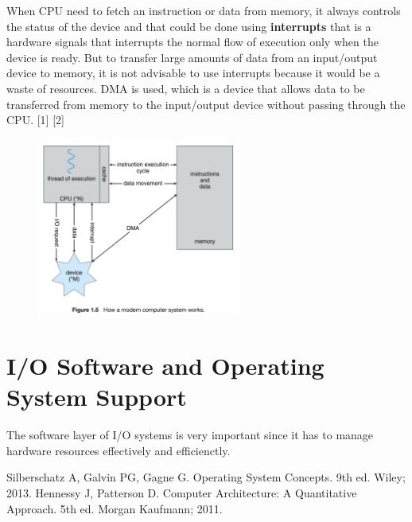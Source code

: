 \documentclass[a4paper]{article}
\begin{document}
When CPU need to fetch an instruction or data from memory, it always controls the status of the device and that could be done using \textbf{interrupts} that is a hardware signals 
that interrupts the normal flow of execution only when the device is ready. But to
 transfer large amounts of data from an input/output device to memory, it is
not advisable to use interrupts because it would be a waste of resources. DMA is used, which 
is a device that allows data to be transferred from memory to the input/output device without passing 
through the CPU. [1] [2]


\begin{figure}[H]
    \centering
    \includegraphics[width=0.6\textwidth]{DMA.png}
\end{figure}

\section{I/O Software and Operating System Support}

The software layer of I/O systems is very important since it has to manage hardware resources effectively and efficienctly.


\begin{thebibliography}{9}
    Silberschatz A, Galvin PG, Gagne G. Operating System Concepts. 9th ed. Wiley; 2013.
    Hennessy J, Patterson D. Computer Architecture: A Quantitative Approach. 5th ed. Morgan Kaufmann; 2011.
\end{thebibliography}
\end{document}
